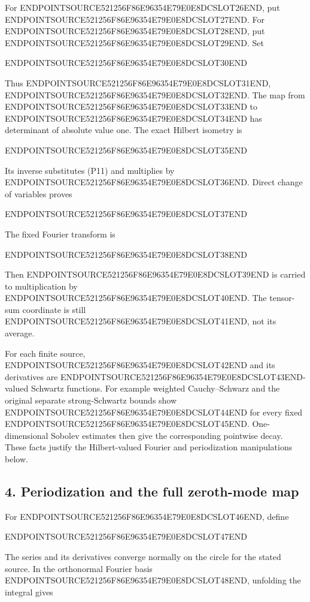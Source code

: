 For ENDPOINTSOURCE521256F86E96354E79E0E8DCSLOT26END, put ENDPOINTSOURCE521256F86E96354E79E0E8DCSLOT27END. For ENDPOINTSOURCE521256F86E96354E79E0E8DCSLOT28END, put ENDPOINTSOURCE521256F86E96354E79E0E8DCSLOT29END. Set

ENDPOINTSOURCE521256F86E96354E79E0E8DCSLOT30END

Thus ENDPOINTSOURCE521256F86E96354E79E0E8DCSLOT31END, ENDPOINTSOURCE521256F86E96354E79E0E8DCSLOT32END. The map from ENDPOINTSOURCE521256F86E96354E79E0E8DCSLOT33END to ENDPOINTSOURCE521256F86E96354E79E0E8DCSLOT34END has determinant of absolute value one. The exact Hilbert isometry is

ENDPOINTSOURCE521256F86E96354E79E0E8DCSLOT35END

Its inverse substitutes (P11) and multiplies by ENDPOINTSOURCE521256F86E96354E79E0E8DCSLOT36END. Direct change of variables proves

ENDPOINTSOURCE521256F86E96354E79E0E8DCSLOT37END

The fixed Fourier transform is

ENDPOINTSOURCE521256F86E96354E79E0E8DCSLOT38END

Then ENDPOINTSOURCE521256F86E96354E79E0E8DCSLOT39END is carried to multiplication by ENDPOINTSOURCE521256F86E96354E79E0E8DCSLOT40END. The tensor-sum coordinate is still ENDPOINTSOURCE521256F86E96354E79E0E8DCSLOT41END, not its average.

For each finite source, ENDPOINTSOURCE521256F86E96354E79E0E8DCSLOT42END and its derivatives are ENDPOINTSOURCE521256F86E96354E79E0E8DCSLOT43END-valued Schwartz functions. For example weighted Cauchy--Schwarz and the original separate strong-Schwartz bounds show ENDPOINTSOURCE521256F86E96354E79E0E8DCSLOT44END for every fixed ENDPOINTSOURCE521256F86E96354E79E0E8DCSLOT45END. One-dimensional Sobolev estimates then give the corresponding pointwise decay. These facts justify the Hilbert-valued Fourier and periodization manipulations below.

\subsection{4. Periodization and the full zeroth-mode map}\label{endpoint-periodized_original--periodization-and-the-full-zeroth-mode-map}

For ENDPOINTSOURCE521256F86E96354E79E0E8DCSLOT46END, define

ENDPOINTSOURCE521256F86E96354E79E0E8DCSLOT47END

The series and its derivatives converge normally on the circle for the stated source. In the orthonormal Fourier basis ENDPOINTSOURCE521256F86E96354E79E0E8DCSLOT48END, unfolding the integral gives

